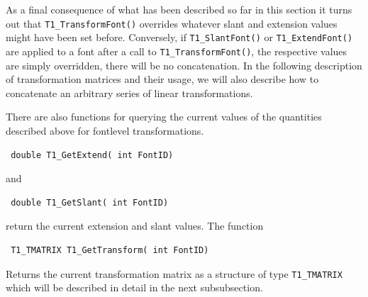 As a final consequence of what has been described so far in this section it
turns out that \verb+T1_TransformFont()+ overrides whatever slant and extension
values might have been set before. Conversely, if \verb+T1_SlantFont()+ or
\verb+T1_ExtendFont()+ are applied to a font after a call to
\verb+T1_TransformFont()+, the respective values are simply overridden, there
will be no concatenation. In the following description of transformation
matrices and their usage, we will also describe how to concatenate an
arbitrary series of linear transformations.

There are also functions for querying the current values of the quantities
described above for fontlevel transformations.
\precorr
\begin{verbatim}
 double T1_GetExtend( int FontID)
\end{verbatim}\postcorr
and
\precorr
\begin{verbatim}
 double T1_GetSlant( int FontID)
\end{verbatim}\postcorr
return the current extension and slant values. The function 
\precorr
\begin{verbatim}
 T1_TMATRIX T1_GetTransform( int FontID)
\end{verbatim}\postcorr
Returns the current transformation matrix as a structure of type
\verb+T1_TMATRIX+ which will be described in detail in the next subsubsection. 

